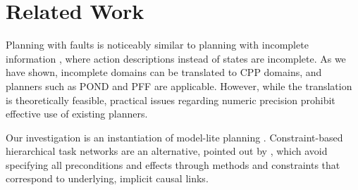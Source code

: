 \documentclass{article}
\def\citep#1{\cite{#1}}
\def\citet#1{\citeA{#1}}
\def\und#1{\noindent{\bf #1}:}
\def\FFRISKY{{\tt DeFAULT}}
\def\und#1{\medskip{\noindent\bf #1:}}
\begin{document}

\section{Related Work}

Planning with faults is noticeably similar to planning with incomplete information \citep{aij-mclug}, where action descriptions instead of states are incomplete.  As we have shown, incomplete domains can be translated to CPP domains, and planners such as POND and PFF \citep{pff} are applicable.  However, while the translation is theoretically feasible, practical issues regarding numeric precision prohibit effective use of existing planners.  

Our investigation is an instantiation of model-lite planning \citet{modellite}.  Constraint-based hierarchical task networks are an alternative, pointed out by \citet{modellite},  which avoid specifying all preconditions and effects through methods and constraints that correspond to underlying, implicit causal links.
\end{document}
